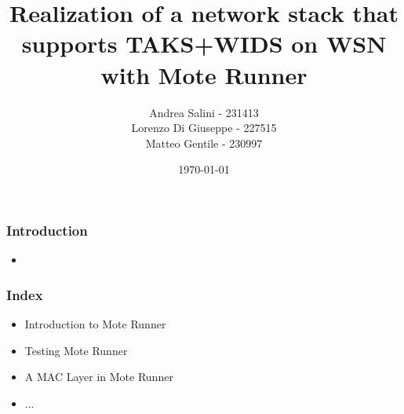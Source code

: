 \documentclass[12pt, compress]{beamer}
\title{Realization of a network stack that supports TAKS+WIDS on WSN with Mote Runner}
\subtitle{}
\date{\today}
\author{Andrea Salini - 231413\\Lorenzo Di Giuseppe - 227515\\Matteo Gentile - 230997}
\institute{DISIM - Università degli Studi dell’Aquila}
\begin{document}
  \maketitle
  
\begin{frame}[fragile]
  \frametitle{Introduction}
  \begin{itemize}
    \item 
  \end{itemize}
\end{frame}

\begin{frame}[fragile]
  \frametitle{Index}
  \begin{itemize}
    \item Introduction to Mote Runner
    \item Testing Mote Runner
    \item A MAC Layer in Mote Runner
    \item ...
  \end{itemize}
\end{frame}




\end{document}
